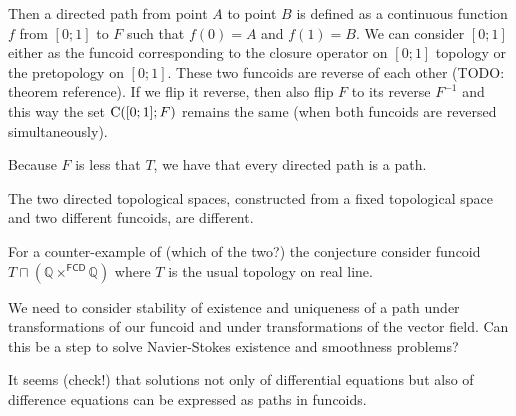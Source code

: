Then a directed path from point $A$ to point $B$ is defined as a continuous function $f$ from $[0;1]$ to $F$ such that $f(0)=A$ and $f(1)=B$.
We can consider $[0;1]$ either as the funcoid corresponding to the closure operator on $[0;1]$ topology or the pretopology on $[0;1]$.
These two funcoids are reverse of each other (TODO: theorem reference). If we flip it reverse, then also flip $F$ to its reverse $F^{-1}$ and
this way the set $\mathrm{C}([0;1];F)$ remains the same (when both funcoids are reversed simultaneously). 

Because $F$ is less that $T$, we have that every directed path is a path.

\begin{conjecture}
The two directed topological spaces, constructed from a fixed topological space and two different funcoids,
are different.
\end{conjecture}

For a counter-example of (which of the two?) the conjecture consider funcoid $T\sqcap(\mathbb{Q}\times^{\mathsf{FCD}}\mathbb{Q})$
where $T$ is the usual topology on real line.

We need to consider stability of existence and uniqueness of a path under transformations of our funcoid and
under transformations of the vector field. Can this be a step to solve Navier-Stokes existence and smoothness problems?

It seems (check!) that solutions not only of differential equations but also of difference equations can be
expressed as paths in funcoids.